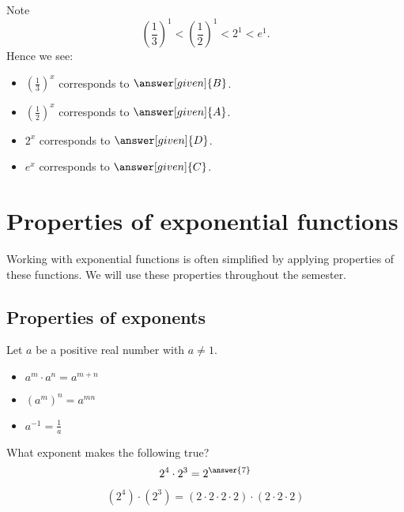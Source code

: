 \documentclass{ximera}
\begin{document}
\begin{example}
\begin{explanation}
\begin{image}
    \end{image}
    Note
    \[
    \left(\frac{1}{3}\right)^1 < \left(\frac{1}{2}\right)^1  < 2^1 < e^1.
    \]
    Hence we see:
    \begin{itemize}
    \item $\left(\frac{1}{3}\right)^{x}$ corresponds to
      $\answer[given]{B}$.
    \item $\left(\frac{1}{2}\right)^{x}$ corresponds to $\answer[given]{A}$.
    \item $2^x$ corresponds to $\answer[given]{D}$.
    \item $e^x$ corresponds to $\answer[given]{C}$.
    \end{itemize}
  \end{explanation}
\end{example}

 
\section{Properties of exponential functions}
 
Working with exponential functions is often simplified by 
applying properties of these functions.  We will use these properties throughout the semester.
 
\subsection{Properties of exponents}
Let $a$ be a positive real number with $a\ne 1$.
\begin{itemize}
  \item $a^m\cdot a^n = a^{m+n}$
  \item $\left(a^m\right)^n = a^{mn}$
  \item $a^{-1} = \frac{1}{a}$
\end{itemize}
\begin{question}
  What exponent makes the following true?
  \[
  2^4 \cdot 2^3 = 2^{\answer{7}}
  \]
  \begin{hint}
    \[
    (2^4) \cdot (2^3) = (2 \cdot 2\cdot 2 \cdot 2) \cdot  (2 \cdot 2\cdot 2)
    \]
  \end{hint}
\end{question}
\end{document}
